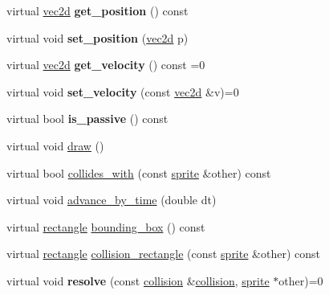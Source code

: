 \begin{DoxyCompactItemize}
\item 
\hypertarget{classcsis3700_1_1sprite_acc128701e9bc6949168ce99ac7f95e70}{virtual \hyperlink{classcsis3700_1_1vec2d}{vec2d} {\bfseries get\-\_\-position} () const }\label{classcsis3700_1_1sprite_acc128701e9bc6949168ce99ac7f95e70}

\item 
\hypertarget{classcsis3700_1_1sprite_a433b1dbe4695990e42490d12d1bfac68}{virtual void {\bfseries set\-\_\-position} (\hyperlink{classcsis3700_1_1vec2d}{vec2d} p)}\label{classcsis3700_1_1sprite_a433b1dbe4695990e42490d12d1bfac68}

\item 
\hypertarget{classcsis3700_1_1sprite_a947c4b01559cbcd9c4dffbc6b39c6fbf}{virtual \hyperlink{classcsis3700_1_1vec2d}{vec2d} {\bfseries get\-\_\-velocity} () const =0}\label{classcsis3700_1_1sprite_a947c4b01559cbcd9c4dffbc6b39c6fbf}

\item 
\hypertarget{classcsis3700_1_1sprite_a3c43d72d94f5428d06d6f01b8753abe9}{virtual void {\bfseries set\-\_\-velocity} (const \hyperlink{classcsis3700_1_1vec2d}{vec2d} \&v)=0}\label{classcsis3700_1_1sprite_a3c43d72d94f5428d06d6f01b8753abe9}

\item 
\hypertarget{classcsis3700_1_1sprite_a01f24c59febf0c1fdd9ec0540ac02959}{virtual bool {\bfseries is\-\_\-passive} () const }\label{classcsis3700_1_1sprite_a01f24c59febf0c1fdd9ec0540ac02959}

\item 
virtual void \hyperlink{classcsis3700_1_1sprite_a6a69657522664635f116e05648792555}{draw} ()
\item 
virtual bool \hyperlink{classcsis3700_1_1sprite_a77871f0f7f7fca2af4b09302e9ec074c}{collides\-\_\-with} (const \hyperlink{classcsis3700_1_1sprite}{sprite} \&other) const 
\item 
virtual void \hyperlink{classcsis3700_1_1sprite_ac4d932bda87ce98a36579de3e1392a8f}{advance\-\_\-by\-\_\-time} (double dt)
\item 
virtual \hyperlink{classcsis3700_1_1rectangle}{rectangle} \hyperlink{classcsis3700_1_1sprite_a103e85a7cbc300db9c0f6bd5abb392dc}{bounding\-\_\-box} () const 
\item 
virtual \hyperlink{classcsis3700_1_1rectangle}{rectangle} \hyperlink{classcsis3700_1_1sprite_a979bf4a0de675c375146d4e6bc7365be}{collision\-\_\-rectangle} (const \hyperlink{classcsis3700_1_1sprite}{sprite} \&other) const 
\item 
\hypertarget{classcsis3700_1_1sprite_a4bf20253e1bc1825bfe73cdfcbb532d2}{virtual void {\bfseries resolve} (const \hyperlink{classcsis3700_1_1collision}{collision} \&\hyperlink{classcsis3700_1_1collision}{collision}, \hyperlink{classcsis3700_1_1sprite}{sprite} $\ast$other)=0}\label{classcsis3700_1_1sprite_a4bf20253e1bc1825bfe73cdfcbb532d2}

\end{DoxyCompactItemize}
